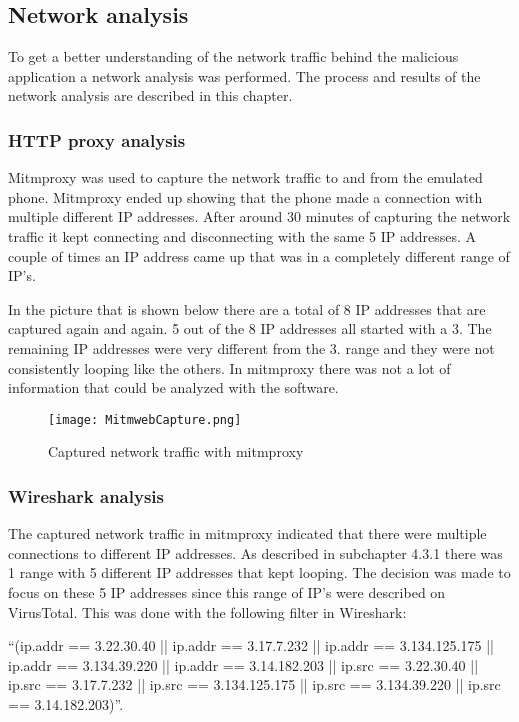 \subsection{Network analysis}
To get a better understanding of the network traffic behind the malicious application a network analysis was performed.
The process and results of the network analysis are described in this chapter.

\subsubsection{HTTP proxy analysis}
Mitmproxy was used to capture the network traffic to and from the emulated phone.
Mitmproxy ended up showing that the phone made a connection with multiple different IP addresses.
After around 30 minutes of capturing the network traffic it kept connecting and disconnecting with the same 5 IP addresses.
A couple of times an IP address came up that was in a completely different range of IP’s.

In the picture that is shown below there are a total of 8 IP addresses that are captured again and again.
5 out of the 8 IP addresses all started with a 3.
The remaining IP addresses were very different from the 3. range and they were not consistently looping like the others.
In mitmproxy there was not a lot of information that could be analyzed with the software.

\begin{figure}[H]
    \centering
    \texttt{[image: MitmwebCapture.png]}
    \caption{Captured network traffic with mitmproxy}
    \label{jordy-mitmweb}
\end{figure}

\newpage
\subsubsection{Wireshark analysis}
The captured network traffic in mitmproxy indicated that there were multiple connections to different IP addresses.
As described in subchapter 4.3.1 there was 1 range with 5 different IP addresses that kept looping.
The decision was made to focus on these 5 IP addresses since this range of IP’s were described on VirusTotal.
This was done with the following filter in Wireshark:

“(ip.addr == 3.22.30.40 || ip.addr == 3.17.7.232 || ip.addr == 3.134.125.175 || ip.addr == 3.134.39.220 || ip.addr == 3.14.182.203 || ip.src == 3.22.30.40 || ip.src == 3.17.7.232 || ip.src == 3.134.125.175 || ip.src == 3.134.39.220 || ip.src == 3.14.182.203)”.
 
